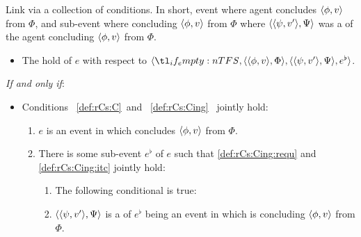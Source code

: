 \begin{note}
  Link via a collection of conditions.
  In short, event where agent concludes \(\langle \phi, v \rangle\) from \(\Phi\), and sub-event where concluding \(\langle \phi, v \rangle\) from \(\Phi\) where \(\langle \langle \psi, v' \rangle, \Psi \rangle\) was a \requ{} of the agent concluding \(\langle \phi, v \rangle\) from \(\Phi\).

  \begin{definition}[\rCon{2}]
    \label{def:rCon}
    \vspace{-\baselineskip}
    \begin{itemize}
    \item
      The \emph{} hold of \(e\) with respect to \(\langle \vAgent{}, \pvp{\phi}{v}{\Phi}, \pvp{\psi}{v'}{\Psi}, e^{\flat} \rangle\).
    \end{itemize}

    \emph{If and only if}:

    \begin{itemize}
    \item
      Conditions~%
      \ref{def:rCs:C}~and~%
      \ref{def:rCs:Cing}~%
      jointly hold:
      \begin{enumerate}[label=\arabic*., ref=(\arabic*)]
      \item
        \label{def:rCs:C}
        \(e\) is an event in which \vAgent{} concludes \(\langle \phi, v \rangle\) from \(\Phi\).
      \item
        \label{def:rCs:Cing}
        There is some sub-event \(e^{\flat}\) of \(e\) such that \ref{def:rCs:Cing:requ} and \ref{def:rCs:Cing:itc} jointly hold:
        \begin{enumerate}[label=\alph*., ref=(\arabic{enumi}\alph*)]
        \item
          \label{def:rCs:Cing:itc}
          The following conditional is true:
        \item
          \label{def:rCs:Cing:requ}
          \(\langle \langle \psi, v' \rangle, \Psi \rangle\) is a \requ{} of \(e^{\flat}\) being an event in which \vAgent{} is concluding \(\langle \phi, v \rangle\) from \(\Phi\).
        \end{enumerate}
      \end{enumerate}
    \end{itemize}
    \vspace{-1.5\baselineskip}
  \end{definition}


\end{note}
